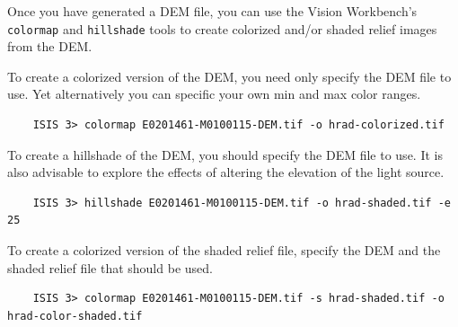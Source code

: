 %

Once you have generated a DEM file, you can use the Vision Workbench's
\texttt{colormap} and \texttt{hillshade} tools to create colorized
and/or shaded relief images from the DEM.

To create a colorized version of the DEM, you need only specify the
DEM file to use. Yet alternatively you can specific your own min and
max color ranges.

\begin{verbatim}
    ISIS 3> colormap E0201461-M0100115-DEM.tif -o hrad-colorized.tif
\end{verbatim}

To create a hillshade of the DEM, you should specify the DEM file
to use. It is also advisable to explore the effects of altering the
elevation of the light source.

\begin{verbatim}
    ISIS 3> hillshade E0201461-M0100115-DEM.tif -o hrad-shaded.tif -e 25
\end{verbatim}

To create a colorized version of the shaded relief file, specify
the DEM and the shaded relief file that should be used.

\begin{verbatim}
    ISIS 3> colormap E0201461-M0100115-DEM.tif -s hrad-shaded.tif -o hrad-color-shaded.tif
\end{verbatim}

